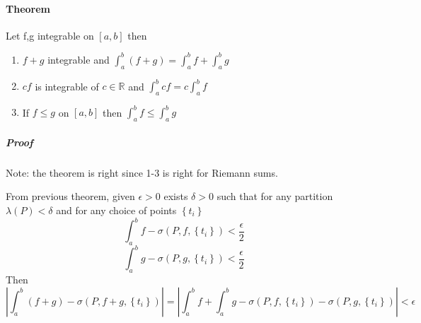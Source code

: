 \paragraph{Theorem} Let f,g integrable on $[a,b]$ then
\begin{enumerate}
	\item $f+g$ integrable and $\int_a^b (f+g)  = \int_a^b f +\int_a^b g $
	\item $cf$ is integrable of $c \in \mathbb{R}$ and $\int_a^b cf  = c\int_a^b f $
	\item If $f \leq g$ on $[a,b]$ then $\int_a^b f  \leq \int_a^b g $
\end{enumerate}
\subparagraph{Proof} 
Note: the theorem is right since 1-3 is right for Riemann sums.

From previous theorem, given $\epsilon > 0$ exists $\delta > 0$ such that for any partition $\lambda(P) < \delta$ and for any choice of points $\left\{ t_i \right\}$
$$\int_a^b f  - \sigma \left(P,f, \left\{ t_i \right\} \right) < \frac{\epsilon}{2}$$
$$\int_a^b g  - \sigma \left(P,g, \left\{ t_i \right\} \right) < \frac{\epsilon}{2}$$
Then
$$\left| \int_a^b (f+g)  - \sigma \left(P,f+g, \left\{ t_i \right\}\right) \right| = \left| \int_a^b f  + \int_a^b g  - \sigma \left(P,f, \left\{ t_i \right\}\right) - \sigma \left(P,g, \left\{ t_i \right\}\right) \right| < \epsilon $$
